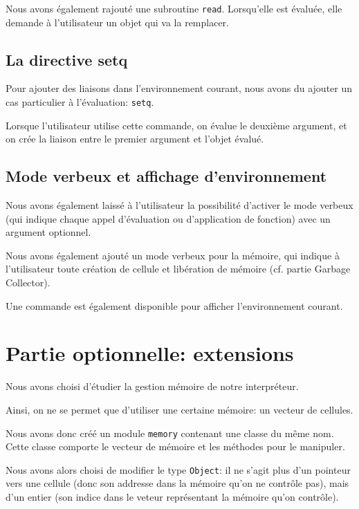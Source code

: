 \documentclass[12pt]{article}
\def\code #1{\lstinline{#1}}
\begin{document}
Nous avons également rajouté une subroutine \code{read}. Lorsqu'elle est évaluée, elle demande à l'utilisateur un objet qui va la remplacer.

\subsection{La directive setq}

Pour ajouter des liaisons dans l'environnement courant, nous avons du ajouter un cas particulier à l'évaluation: \code{setq}. 

Lorsque l'utilisateur utilise cette commande, on évalue le deuxième argument, et on crée la liaison entre le premier argument et l'objet évalué.


\subsection{Mode verbeux et affichage d'environnement}

Nous avons également laissé à l'utilisateur la possibilité d'activer le mode verbeux (qui indique chaque appel d'évaluation ou d'application de fonction) avec un argument optionnel.

Nous avons également ajouté un mode verbeux pour la mémoire, qui indique à l'utilisateur toute création de cellule et libération de mémoire (cf. partie Garbage Collector).

Une commande est également disponible pour afficher l'environnement courant.


\section{Partie optionnelle: extensions}

Nous avons choisi d'étudier la gestion mémoire de notre interpréteur.

Ainsi, on ne se permet que d'utiliser une certaine mémoire: un vecteur de cellules.

Nous avons donc créé un module \code{memory} contenant une classe du même nom. Cette classe comporte le vecteur de mémoire et les méthodes pour le manipuler.

Nous avons alors choisi de modifier le type \code{Object}: il ne s'agit plus d'un pointeur vers une cellule (donc son addresse dans la mémoire qu'on ne contrôle pas), mais d'un entier (son indice dans le veteur représentant la mémoire qu'on contrôle).
\end{document}
